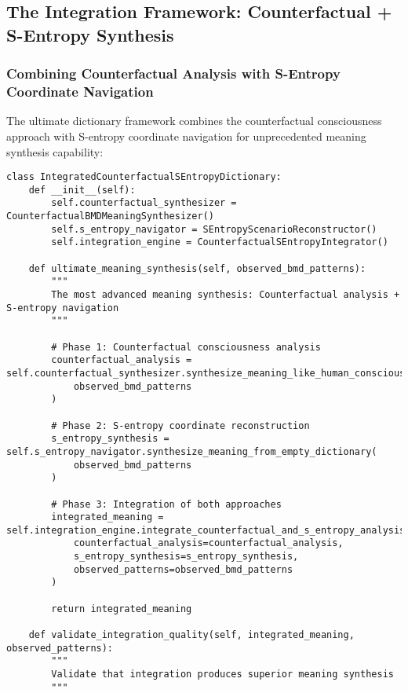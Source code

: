 \documentclass[12pt,a4paper]{article}
\begin{document}
\subsection{The Integration Framework: Counterfactual + S-Entropy Synthesis}

\subsubsection{Combining Counterfactual Analysis with S-Entropy Coordinate Navigation}

The ultimate dictionary framework combines the counterfactual consciousness approach with S-entropy coordinate navigation for unprecedented meaning synthesis capability:

\begin{lstlisting}[style=pythonstyle, caption=Integrated Counterfactual S-Entropy BMD Dictionary]
class IntegratedCounterfactualSEntropyDictionary:
    def __init__(self):
        self.counterfactual_synthesizer = CounterfactualBMDMeaningSynthesizer()
        self.s_entropy_navigator = SEntropyScenarioReconstructor()
        self.integration_engine = CounterfactualSEntropyIntegrator()
        
    def ultimate_meaning_synthesis(self, observed_bmd_patterns):
        """
        The most advanced meaning synthesis: Counterfactual analysis + S-entropy navigation
        """
        
        # Phase 1: Counterfactual consciousness analysis
        counterfactual_analysis = self.counterfactual_synthesizer.synthesize_meaning_like_human_consciousness(
            observed_bmd_patterns
        )
        
        # Phase 2: S-entropy coordinate reconstruction
        s_entropy_synthesis = self.s_entropy_navigator.synthesize_meaning_from_empty_dictionary(
            observed_bmd_patterns
        )
        
        # Phase 3: Integration of both approaches
        integrated_meaning = self.integration_engine.integrate_counterfactual_and_s_entropy_analysis(
            counterfactual_analysis=counterfactual_analysis,
            s_entropy_synthesis=s_entropy_synthesis,
            observed_patterns=observed_bmd_patterns
        )
        
        return integrated_meaning
    
    def validate_integration_quality(self, integrated_meaning, observed_patterns):
        """
        Validate that integration produces superior meaning synthesis
        """
        

\end{lstlisting}
\end{document}
